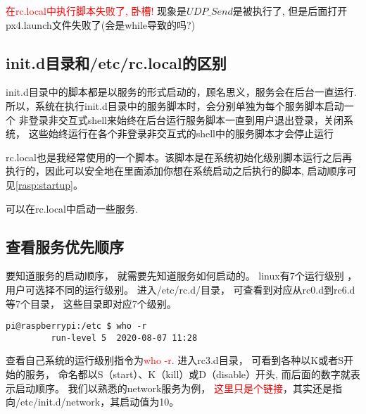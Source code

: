 \textcolor{red}{在rc.local中执行脚本失败了, 卧槽!} 
现象是$UDP\_Send$是被执行了,
但是后面打开px4.launch文件失败了(会是while导致的吗?)

\subsection{init.d目录和/etc/rc.local的区别}

init.d目录中的脚本都是以服务的形式启动的，顾名思义，服务会在后台一直运行. 
所以，系统在执行init.d目录中的服务脚本时，会分别单独为每个服务脚本启动一个
非登录非交互式shell来始终在后台运行服务脚本一直到用户退出登录，关闭系统，
这些始终运行在各个非登录非交互式的shell中的服务脚本才会停止运行 \par
rc.local也是我经常使用的一个脚本。该脚本是在系统初始化级别脚本运行之后再执行的，因此可以安全地在里面添加你想在系统启动之后执行的脚本, 启动顺序可见\ref{rasp:startup}。\par
可以在rc.local中启动一些服务. 

\subsection{查看服务优先顺序}
要知道服务的启动顺序，
就需要先知道服务如何启动的。
linux有7个运行级别
，用户可选择不同的运行级别。
进入/etc/rc.d/目录，
可查看到对应从rc0.d到rc6.d等7个目录，
这些目录即对应7个级别。
\begin{lstlisting}[title=查看运行级别]
    pi@raspberrypi:/etc $ who -r 
         run-level 5  2020-08-07 11:28
\end{lstlisting}
查看自己系统的运行级别指令为\textcolor{red}{who -r}. 进入rc3.d目录，
可看到各种以K或者S开始的服务，
命名都以S（start）、K（kill）或D（disable）开头, 
而后面的数字就表示启动顺序。
我们以熟悉的network服务为例，
\textcolor{red}{这里只是个链接}，其实还是指向/etc/init.d/network，其启动值为10。
